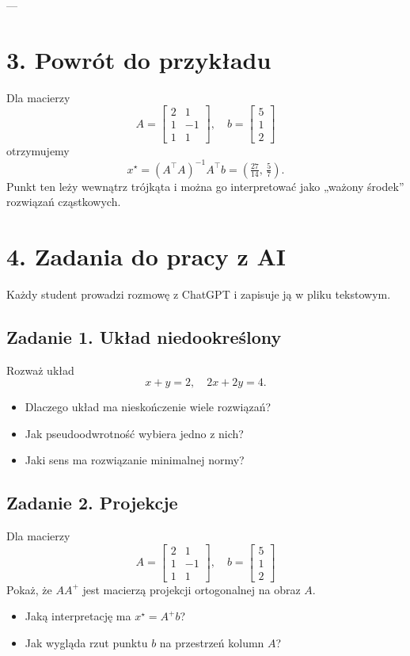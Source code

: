 \documentclass[12pt,a4paper]{article}
\begin{document}
---

\section*{3. Powrót do przykładu}
Dla macierzy
\[
A=\begin{bmatrix}2 & 1\\ 1 & -1\\ 1 & 1\end{bmatrix},\quad
b=\begin{bmatrix}5\\1\\2\end{bmatrix}
\]
otrzymujemy
\[
x^\star=(A^\top A)^{-1}A^\top b=\left(\tfrac{27}{14},\,\tfrac{5}{7}\right).
\]
Punkt ten leży wewnątrz trójkąta i można go interpretować jako „ważony środek” rozwiązań cząstkowych.

\section*{4. Zadania do pracy z AI}
Każdy student prowadzi rozmowę z ChatGPT i zapisuje ją w pliku tekstowym.

\subsection*{Zadanie 1. Układ niedookreślony}
Rozważ układ
\[
x+y=2,\quad 2x+2y=4.
\]
\begin{itemize}
    \item Dlaczego układ ma nieskończenie wiele rozwiązań?
    \item Jak pseudoodwrotność wybiera jedno z nich?
    \item Jaki sens ma rozwiązanie minimalnej normy?
\end{itemize}



\subsection*{Zadanie 2. Projekcje}
Dla macierzy
\[
A=\begin{bmatrix}2 & 1\\ 1 & -1\\ 1 & 1\end{bmatrix},\quad
b=\begin{bmatrix}5\\1\\2\end{bmatrix}
\]
Pokaż, że $AA^+$ jest macierzą projekcji ortogonalnej na obraz $A$.
\begin{itemize}
    \item Jaką interpretację ma $x^\star=A^+b$?
    \item Jak wygląda rzut punktu $b$ na przestrzeń kolumn $A$?
\end{itemize}
\end{document}

